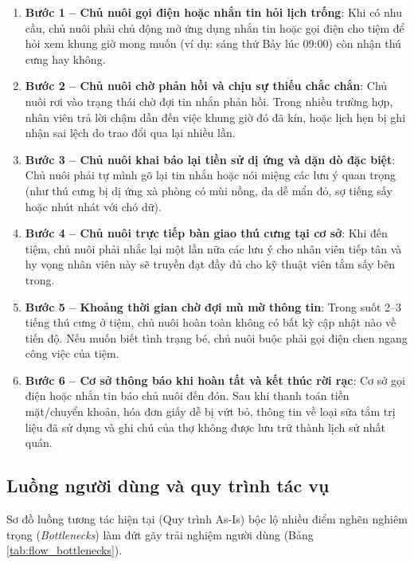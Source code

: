 \begin{enumerate}
    \item \textbf{Bước 1 -- Chủ nuôi gọi điện hoặc nhắn tin hỏi lịch trống}: Khi có nhu cầu, chủ nuôi phải chủ động mở ứng dụng nhắn tin hoặc gọi điện cho tiệm để hỏi xem khung giờ mong muốn (ví dụ: sáng thứ Bảy lúc 09:00) còn nhận thú cưng hay không.
    \item \textbf{Bước 2 -- Chủ nuôi chờ phản hồi và chịu sự thiếu chắc chắn}: Chủ nuôi rơi vào trạng thái chờ đợi tin nhắn phản hồi. Trong nhiều trường hợp, nhân viên trả lời chậm dẫn đến việc khung giờ đó đã kín, hoặc lịch hẹn bị ghi nhận sai lệch do trao đổi qua lại nhiều lần.
    \item \textbf{Bước 3 -- Chủ nuôi khai báo lại tiền sử dị ứng và dặn dò đặc biệt}: Chủ nuôi phải tự mình gõ lại tin nhắn hoặc nói miệng các lưu ý quan trọng (như thú cưng bị dị ứng xà phòng có mùi nồng, da dễ mẩn đỏ, sợ tiếng sấy hoặc nhút nhát với chó dữ).
    \item \textbf{Bước 4 -- Chủ nuôi trực tiếp bàn giao thú cưng tại cơ sở}: Khi đến tiệm, chủ nuôi phải nhắc lại một lần nữa các lưu ý cho nhân viên tiếp tân và hy vọng nhân viên này sẽ truyền đạt đầy đủ cho kỹ thuật viên tắm sấy bên trong.
    \item \textbf{Bước 5 -- Khoảng thời gian chờ đợi mù mờ thông tin}: Trong suốt 2--3 tiếng thú cưng ở tiệm, chủ nuôi hoàn toàn không có bất kỳ cập nhật nào về tiến độ. Nếu muốn biết tình trạng bé, chủ nuôi buộc phải gọi điện chen ngang công việc của tiệm.
    \item \textbf{Bước 6 -- Cơ sở thông báo khi hoàn tất và kết thúc rời rạc}: Cơ sở gọi điện hoặc nhắn tin báo chủ nuôi đến đón. Sau khi thanh toán tiền mặt/chuyển khoản, hóa đơn giấy dễ bị vứt bỏ, thông tin về loại sữa tắm trị liệu đã sử dụng và ghi chú của thợ không được lưu trữ thành lịch sử nhất quán.
\end{enumerate}

\subsection{Luồng người dùng và quy trình tác vụ}
Sơ đồ luồng tương tác hiện tại (Quy trình As-Is) bộc lộ nhiều điểm nghẽn nghiêm trọng (\textit{Bottlenecks}) làm đứt gãy trải nghiệm người dùng (Bảng \ref{tab:flow_bottlenecks}).

